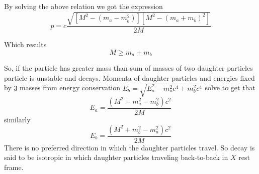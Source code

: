 By solving the above relation we got the expression 
        \begin{equation}
            p = c\frac{\sqrt{[M^2-(m_{a}-m_{b}^2)][M^2-(m_a +m_b)^2]}}{2M}
        \end{equation}

Which results  
    \begin{equation}
         M \geq m_{a} + m_{b}
    \end{equation}

So, if the particle has greater mass than sum of masses of two daughter particles
particle is unstable and decays.  Momenta of daughter particles and energies fixed by $3$ masses
from energy conservation $E_{b}=\sqrt{E_{a}^2-m_{a}^2c^4+m_{b}^2c^4}$ solve to get that 
        \begin{equation}
            E_{a} = \frac{(M^2+m_{a}^2-m_{b}^2)c^{2}}{2M}
        \end{equation}
    similarly
        \begin{equation}
            E_{b} = \frac{(M^2+m_{b}^2-m_{a}^2)c^{2}}{2M}
        \end{equation}
There is no preferred direction in which the daughter particles travel. So decay is said to be isotropic in which daughter particles traveling back-to-back in $X$ rest frame.


